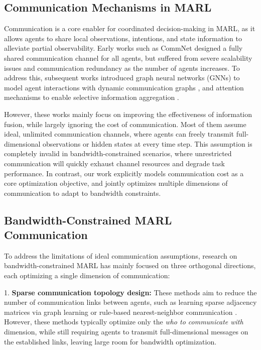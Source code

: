\documentclass[10pt, twocolumn]{IEEEtran}
\begin{document}
\subsection{Communication Mechanisms in MARL}
Communication is a core enabler for coordinated decision-making in MARL, as it allows agents to share local observations, intentions, and state information to alleviate partial observability. Early works such as CommNet \cite{sukhbaatar2016learning} designed a fully shared communication channel for all agents, but suffered from severe scalability issues and communication redundancy as the number of agents increases. To address this, subsequent works introduced graph neural networks (GNNs) to model agent interactions with dynamic communication graphs \cite{jiang2020graph}, and attention mechanisms to enable selective information aggregation \cite{iqbal2019actor}.

However, these works mainly focus on improving the effectiveness of information fusion, while largely ignoring the cost of communication. Most of them assume ideal, unlimited communication channels, where agents can freely transmit full-dimensional observations or hidden states at every time step. This assumption is completely invalid in bandwidth-constrained scenarios, where unrestricted communication will quickly exhaust channel resources and degrade task performance. In contrast, our work explicitly models communication cost as a core optimization objective, and jointly optimizes multiple dimensions of communication to adapt to bandwidth constraints.

\subsection{Bandwidth-Constrained MARL Communication}
To address the limitations of ideal communication assumptions, research on bandwidth-constrained MARL has mainly focused on three orthogonal directions, each optimizing a single dimension of communication:

1. \textbf{Sparse communication topology design:} These methods aim to reduce the number of communication links between agents, such as learning sparse adjacency matrices via graph learning \cite{li2020improving} or rule-based nearest-neighbor communication \cite{wang2023adaptive}. However, these methods typically optimize only the \textit{who to communicate with} dimension, while still requiring agents to transmit full-dimensional messages on the established links, leaving large room for bandwidth optimization.
\end{document}
